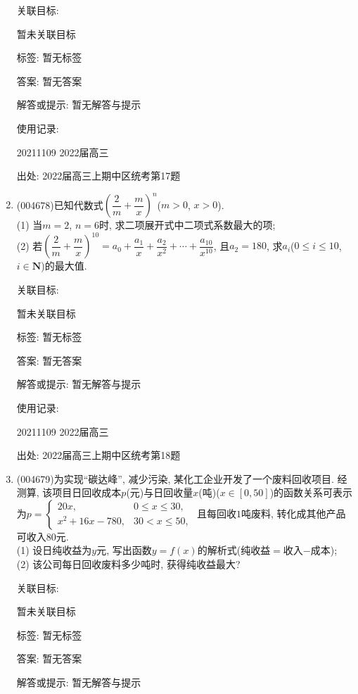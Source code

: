 \documentclass[10pt,a4paper]{article}
\begin{document}
\begin{enumerate}[1.]
关联目标:

暂未关联目标



标签: 暂无标签

答案: 暂无答案

解答或提示: 暂无解答与提示

使用记录:

20211109	2022届高三		


出处: 2022届高三上期中区统考第17题
\item { (004678)}已知代数式$(\dfrac 2m+\dfrac mx)^n$($m>0$, $x>0$).\\
(1) 当$m=2$, $n=6$时, 求二项展开式中二项式系数最大的项;\\
(2) 若$(\dfrac 2m+\dfrac mx)^{10}=a_0+\dfrac{a_1}x+\dfrac{a_2}{x^2}+\cdots +\dfrac{a_{10}}{x^{10}}$, 且$a_2=180$, 求$a_i$($0\le i \le 10$, $i\in \mathbf{N}$)的最大值.


关联目标:

暂未关联目标



标签: 暂无标签

答案: 暂无答案

解答或提示: 暂无解答与提示

使用记录:

20211109	2022届高三		


出处: 2022届高三上期中区统考第18题
\item { (004679)}为实现``碳达峰'', 减少污染, 某化工企业开发了一个废料回收项目. 经测算, 该项目日回收成本$p$(元)与日回收量$x$(吨)($x\in [0,50]$)的函数关系可表示为$p=\begin{cases}20x, & 0\le x\le 30,  \\ x^2+16x-780, & 30<x \le 50,  \end{cases}$ 且每回收$1$吨废料, 转化成其他产品可收入$80$元.\\
(1) 设日纯收益为$y$元, 写出函数$y=f(x)$的解析式(纯收益$=$收入$-$成本);\\
(2) 该公司每日回收废料多少吨时, 获得纯收益最大?


关联目标:

暂未关联目标



标签: 暂无标签

答案: 暂无答案

解答或提示: 暂无解答与提示


\end{enumerate}
\end{document}
